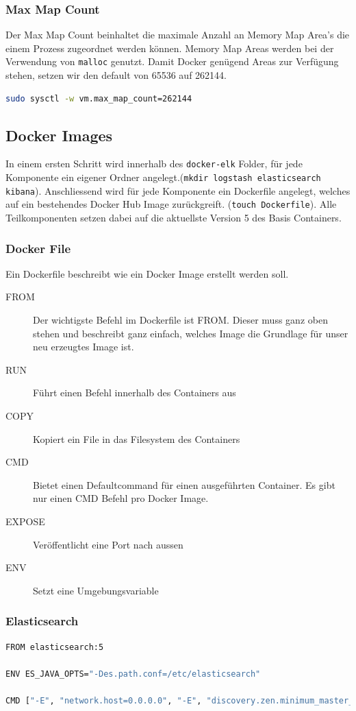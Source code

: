 \subsubsection{Max Map Count}
Der Max Map Count beinhaltet die maximale Anzahl an Memory Map Area's die einem Prozess zugeordnet werden können. Memory Map Areas werden bei der Verwendung von \lstinline[]|malloc| genutzt. Damit Docker genügend Areas zur Verfügung stehen, setzen wir den default von 65536 auf 262144.
\begin{lstlisting}[language=bash]
sudo sysctl -w vm.max_map_count=262144
\end{lstlisting}

\subsection{Docker Images}
In einem ersten Schritt wird innerhalb des \lstinline[]|docker-elk| Folder, für jede Komponente ein eigener Ordner angelegt.(\lstinline[]|mkdir logstash elasticsearch kibana|). Anschliessend wird für jede Komponente ein Dockerfile angelegt, welches auf ein bestehendes Docker Hub Image zurückgreift. (\lstinline[]|touch Dockerfile|). Alle Teilkomponenten setzen dabei auf die aktuellste Version 5 des Basis Containers.

\subsubsection{Docker File}
Ein Dockerfile beschreibt wie ein Docker Image erstellt werden soll. 
\begin{description}
	\item[FROM] Der wichtigste Befehl im Dockerfile ist FROM. Dieser muss ganz oben stehen und beschreibt ganz einfach, welches Image die Grundlage für unser neu erzeugtes Image ist.	
	\item[RUN] Führt einen Befehl innerhalb des Containers aus
	\item[COPY] Kopiert ein File in das Filesystem des Containers
	\item[CMD] Bietet einen Defaultcommand für einen ausgeführten Container. Es gibt nur einen CMD Befehl pro Docker Image.
	\item[EXPOSE] Veröffentlicht eine Port nach aussen
	\item[ENV] Setzt eine Umgebungsvariable
\end{description}

\subsubsection{Elasticsearch}
\begin{lstlisting}[caption=Elasticsearch Dockerfile, language=bash]
FROM elasticsearch:5

ENV ES_JAVA_OPTS="-Des.path.conf=/etc/elasticsearch"

CMD ["-E", "network.host=0.0.0.0", "-E", "discovery.zen.minimum_master_nodes=1"]
\end{lstlisting}

